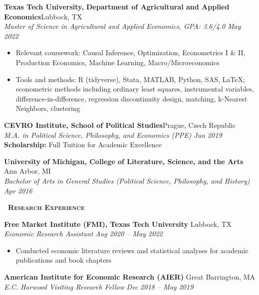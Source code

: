 \documentclass[a4paper,11pt]{article}
\newcommand{\header} [1] {
    {\textsc{\textbf{\Large{\xrfill[0.5ex]{0.5pt}~#1~\xrfill[0.5ex]{0.5pt}}}}}
}
\begin{document}
\vspace{1mm}
\textbf{Texas Tech University, Department of Agricultural and Applied Economics}\hfill Lubbock, TX\\
\textit{Master of Science in Agricultural and Applied Economics, GPA: 3.6/4.0} \hfill  \textit{May 2022}
\begin{itemize}
\item Relevant coursework: Causal Inference, Optimization, Econometrics I \& II, Production Economics, Machine Learning, Macro/Microeconomics
\item Tools and methods: R (tidyverse), Stata, MATLAB, Python, SAS, \LaTeX; econometric methods including ordinary least squares, instrumental variables, difference-in-difference, regression discontinuity design, matching, k-Nearest Neighbors, clustering
\end{itemize}

\vspace{1mm}
\textbf{CEVRO Institute, School of Political Studies}\hfill Prague, Czech Republic\\
\textit{M.A. in Political Science, Philosophy, and Economics (PPE)} \hfill  \textit{Jun 2019}\\
\textbf{Scholarship:} Full Tuition for Academic Excellence

\vspace{1mm}
\textbf{University of Michigan, College of Literature, Science, and the Arts} \hfill Ann Arbor, MI\\
\textit{Bachelor of Arts in General Studies (Political Science, Philosophy, and History)} \hfill  \textit{Apr 2016}

\vspace{2mm}
\header{Research Experience}

\vspace{1mm}
\textbf{Free Market Institute (FMI), Texas Tech University} \hfill Lubbock, TX\\
\textit{Economic Research Assistant} \hfill  \textit{Aug 2020 -- May 2022}
\begin{itemize}
\item Conducted economic literature reviews and statistical analyses for academic publications and book chapters
\end{itemize}

\vspace{1mm}
\textbf{American Institute for Economic Research (AIER)} \hfill Great Barrington, MA\\
\textit{E.C. Harwood Visiting Research Fellow} \hfill  \textit{Dec 2018 -- May 2019}
\end{document}
